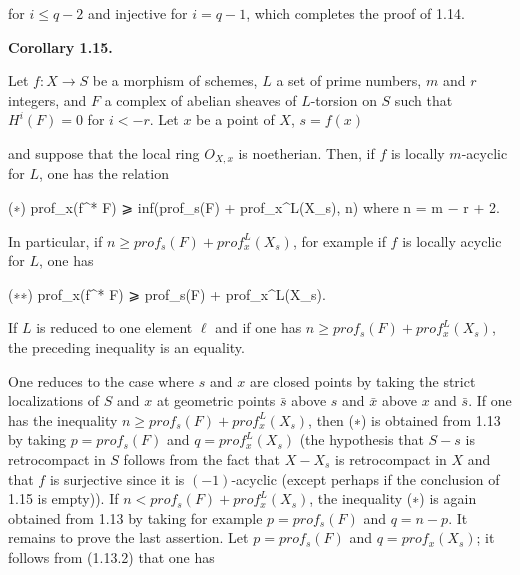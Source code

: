 \documentclass[
]{article}
\newenvironment{Shaded}{}{}
\newcommand{\NormalTok}[1]{#1}
\begin{document}
for \(i \leqslant q - 2\) and injective for \(i = q - 1\), which
completes the proof of 1.14.

\textbf{Corollary 1.15.}

Let \(f : X \to S\) be a morphism of schemes, \(L\) a set of prime
numbers, \(m\) and \(r\) integers, and \(F\) a complex of abelian
sheaves of \(L\)-torsion on \(S\) such that \(H^{i}(F) = 0\) for
\(i < -r\). Let \(x\) be a point of \(X\), \(s = f(x)\)

and suppose that the local ring \(O_{X,x}\) is noetherian. Then, if
\(f\) is locally \(m\)-acyclic for \(L\), one has the relation

\begin{Shaded}
\begin{Highlighting}[]
\NormalTok{(∗)    prof\_x(f\^{}* F) ⩾ inf(prof\_s(F) + prof\_x\^{}L(X\_s), n)   where n = m − r + 2.}
\end{Highlighting}
\end{Shaded}

In particular, if \(n \geqslant prof_{s}(F) + prof^{L}_{x}(X_{s})\), for
example if \(f\) is locally acyclic for \(L\), one has

\begin{Shaded}
\begin{Highlighting}[]
\NormalTok{(∗∗)   prof\_x(f\^{}* F) ⩾ prof\_s(F) + prof\_x\^{}L(X\_s).}
\end{Highlighting}
\end{Shaded}

If \(L\) is reduced to one element \(\ell\) and if one has
\(n \geqslant prof_{s}(F) + prof^{L}_{x}(X_{s})\), the preceding
inequality is an equality.

One reduces to the case where \(s\) and \(x\) are closed points by
taking the strict localizations of \(S\) and \(x\) at geometric points
\(\bar{s}\) above \(s\) and \(\bar{x}\) above \(x\) and \(\bar{s}\). If
one has the inequality
\(n \geqslant prof_{s}(F) + prof^{L}_{x}(X_{s})\), then (∗) is obtained
from 1.13 by taking \(p = prof_{s}(F)\) and \(q = prof^{L}_{x}(X_{s})\)
(the hypothesis that \(S - {s}\) is retrocompact in \(S\) follows from
the fact that \(X - X_{s}\) is retrocompact in \(X\) and that \(f\) is
surjective since it is \((-1)\)-acyclic (except perhaps if the
conclusion of 1.15 is empty)). If
\(n < prof_{s}(F) + prof^{L}_{x}(X_{s})\), the inequality (∗) is again
obtained from 1.13 by taking for example \(p = prof_{s}(F)\) and
\(q = n - p\). It remains to prove the last assertion. Let
\(p = prof_{s}(F)\) and \(q = prof_{x}(X_{s})\); it follows from
(1.13.2) that one has
\end{document}
